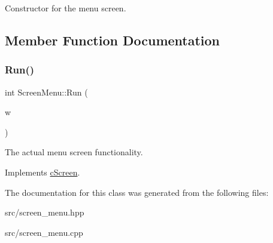 Constructor for the menu screen. 

\subsection{Member Function Documentation}
\hypertarget{classScreenMenu_a86af8a6c97bf315bbe88cd2d7ab35abf}{}\label{classScreenMenu_a86af8a6c97bf315bbe88cd2d7ab35abf} 
\subsubsection{\texorpdfstring{Run()}{Run()}}
{\footnotesize\ttfamily int Screen\+Menu\+::\+Run (\begin{DoxyParamCaption}\item[{sf\+::\+Render\+Window \&}]{w }\end{DoxyParamCaption})\hspace{0.3cm}{\ttfamily [virtual]}}

The actual menu screen functionality. 

Implements \hyperlink{classcScreen_a4b4057ffec7ab1492a4de19f9994cac4}{c\+Screen}.



The documentation for this class was generated from the following files\+:\begin{DoxyCompactItemize}
\item 
src/screen\+\_\+menu.\+hpp\item 
src/screen\+\_\+menu.\+cpp\end{DoxyCompactItemize}
